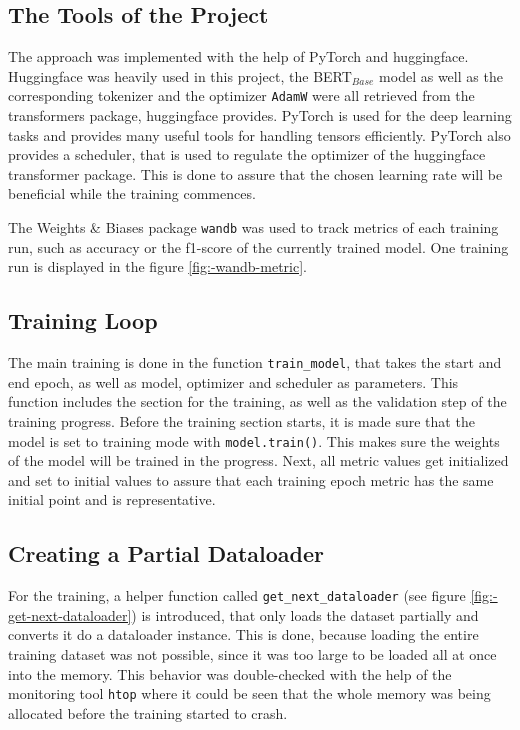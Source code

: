         \subsection{The Tools of the Project}
        \label{sec:-tools-of-the-project}
            The approach was implemented with the help of PyTorch and huggingface.
            Huggingface was heavily used in this project, the BERT$_{Base}$ model as well as the corresponding tokenizer and the optimizer \texttt{AdamW} were all retrieved from the transformers package, huggingface provides. 
            PyTorch is used for the deep learning tasks and provides many useful tools for handling tensors efficiently. 
            PyTorch also provides a scheduler, that is used to regulate the optimizer of the huggingface transformer package.
            This is done to assure that the chosen learning rate will be beneficial while the training commences.

            The Weights \& Biases package \texttt{wandb} was used to track metrics of each training run, such as accuracy or the f1-score of the currently trained model.
            One training run is displayed in the figure \ref{fig:-wandb-metric}.

        \subsection{Training Loop}
        \label{sec:-training-loop}
            The main training is done in the function \texttt{train\_model}, that takes the start and end epoch, as well as model, optimizer and scheduler as parameters.
            This function includes the section for the training, as well as the validation step of the training progress.
            Before the training section starts, it is made sure that the model is set to training mode with \texttt{model.train()}. This makes sure the weights of the model will be trained in the progress.
            Next, all metric values get initialized and set to initial values to assure that each training epoch metric has the same initial point and is representative.

        \subsection{Creating a Partial Dataloader}
        \label{sec:-creating-a-partial-dataloader}
            For the training, a helper function called \texttt{get\_next\_dataloader} (see figure \ref{fig:-get-next-dataloader}) is introduced, that only loads the dataset partially and converts it do a dataloader instance. This is done, because loading the entire training dataset was not possible, since it was too large to be loaded all at once into the memory.
            This behavior was double-checked with the help of the monitoring tool \texttt{htop} where it could be seen that the whole memory was being allocated before the training started to crash.

